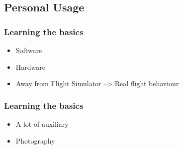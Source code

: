 \subsection{Personal Usage}

\begin{frame}
\frametitle{Learning the basics}

  \begin{itemize}
    \item Software
    \item Hardware
    \item Away from Flight Simulator --> Real flight behaviour
  \end{itemize}
  
\end{frame}



\begin{frame}
\frametitle{Learning the basics}

  \begin{itemize}
    \item A lot of auxiliary
    \item Photography
  \end{itemize}
    
\end{frame}


